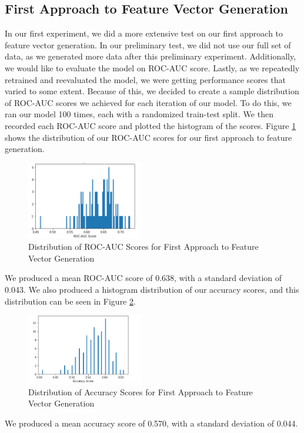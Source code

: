 \documentclass[10pt,twocolumn,letterpaper]{article}
\begin{document}
\subsection{First Approach to Feature Vector Generation}
In our first experiment, we did a more extensive test on our first approach to feature vector generation. In our preliminary test,
we did not use our full set of data, as we generated more data after this preliminary experiment. Additionally, we would like to evaluate
the model on ROC-AUC score. Lastly, as we repeatedly retrained and reevaluated the model, we were getting performance scores that varied 
to some extent. Because of this, we decided to create a sample distribution of ROC-AUC scores we achieved for each iteration of our model. To do this,
we ran our model 100 times, each with a randomized train-test split. We then recorded each ROC-AUC score and plotted the histogram of the scores.
Figure \ref{fig:rocauc1} shows the distribution of our ROC-AUC scores for our first approach to feature generation.

\begin{figure}[h]
  \centering
  \includegraphics[width=0.45\textwidth]{imgs/approach1_rocauc.png}
  \caption{Distribution of ROC-AUC Scores for First Approach to Feature Vector Generation}
  \label{fig:rocauc1}
\end{figure}
We produced a mean ROC-AUC score of 0.638, with a standard deviation of 0.043. We also produced a histogram distribution of our accuracy scores, and
this distribution can be seen in Figure \ref{fig:accuracy1}.
\begin{figure}[h]
  \centering
  \includegraphics[width=0.45\textwidth]{imgs/approach1_acc.png}
  \caption{Distribution of Accuracy Scores for First Approach to Feature Vector Generation}
  \label{fig:accuracy1}
\end{figure}
We produced a mean accuracy score of 0.570, with a standard deviation of 0.044.
\end{document}
